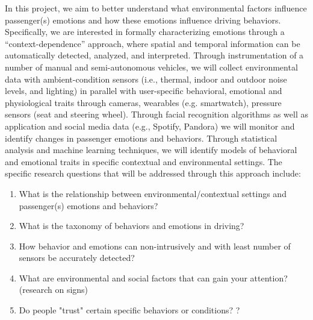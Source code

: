  In this project, we aim to better understand what environmental factors influence passenger(s) emotions and how these emotions influence driving behaviors. Specifically, we are interested in formally characterizing emotions through a “context-dependence” approach, where spatial and temporal information can be automatically detected, analyzed, and interpreted. Through instrumentation of a number of manual and semi-autonomous  vehicles, we will collect environmental data with ambient-condition sensors (i.e., thermal, indoor and outdoor noise levels, and lighting) in parallel with user-specific behavioral, emotional and physiological traits through cameras, wearables (e.g. smartwatch), pressure sensors (seat and steering wheel). Through facial recognition algorithms as well as application and social media data (e.g., Spotify, Pandora) we will monitor and identify changes in passenger emotions and behaviors. Through statistical analysis and machine learning techniques, we will identify models of behavioral and emotional traits in specific contextual and environmental settings. The specific research questions that will be addressed through this approach include: 
\begin{enumerate}
    \item What is the relationship between environmental/contextual settings and passenger(s) emotions and behaviors?
    \item What is the taxonomy of behaviors and emotions in driving?
    \item How behavior and emotions can non-intrusively and with least number of sensors be accurately detected?
    \item What are environmental and social factors that can gain your attention? (research on signs)
    \item Do people "trust" certain specific behaviors or conditions? ? 

\end{enumerate}

